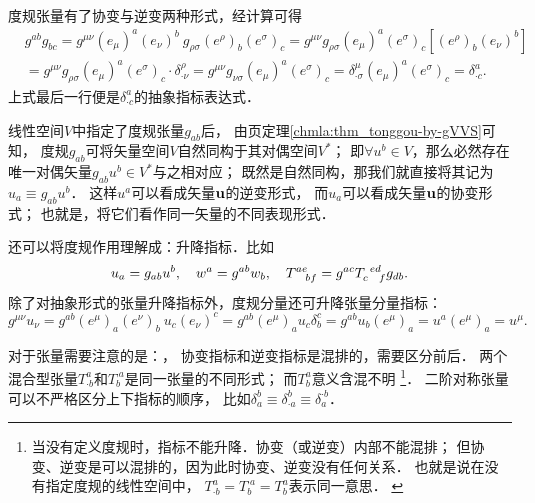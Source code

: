 度规张量有了协变与逆变两种形式，经计算可得
\begin{equation}
\begin{aligned}
    &g^{ab}g_{bc} = g^{\mu\nu} (e_\mu)^a (e_\nu)^b \ 
       g_{\rho\sigma} (e^\rho)_b (e^\sigma)_c
       =g^{\mu\nu}g_{\rho\sigma}(e_\mu)^a (e^\sigma)_c
       \left[(e^\rho)_b (e_\nu)^b \right] \\
    &= g^{\mu\nu}g_{\rho\sigma}(e_\mu)^a (e^\sigma)_c \cdot \delta^\rho _{\cdot \nu} 
     = g^{\mu\nu}g_{\nu\sigma}(e_\mu)^a (e^\sigma)_c 
    = \delta^\mu _{\cdot \sigma} (e_\mu)^a (e^\sigma)_c 
    = \delta^a_{\cdot c} .
\end{aligned}
\end{equation}
上式最后一行便是$\delta^a_{\cdot c}$的抽象指标表达式．


线性空间$V$中指定了度规张量$g_{ab}$后，
由\pageref{chmla:thm_tonggou-by-gVVS}页定理\ref{chmla:thm_tonggou-by-gVVS}可知，
度规$g_{ab}$可将矢量空间$V${\kaishu 自然同构}于其对偶空间$V^*$；
即$\forall u^b \in V$，那么必然存在唯一对偶矢量$g_{ab}u^b\in V^*$与之相对应；
既然是自然同构，那我们就直接将其记为$u_a \equiv g_{ab}u^b$．
这样$u^a$可以看成矢量$\bf u$的逆变形式，
而$u_a$可以看成矢量$\bf u$的协变形式；
也就是，将它们看作同一矢量的不同表现形式．


还可以将度规作用理解成：升降指标．比如
\begin{equation*}
    u_a =g_{ab}u^b, \quad w^a=g^{ab}w_b, \quad
    T^{ae}_{\hphantom{ae} bf}=g^{ac}T^{\hphantom{c} ed}_{c \hphantom{ed} f}g_{db} .
\end{equation*}
除了对抽象形式的张量升降指标外，度规分量还可升降张量分量指标：
\begin{equation*}
    g^{\mu\nu} u_\nu = g^{ab} (e^\mu)_a (e^\nu)_b \ u_c (e_\nu)^c
    =g^{ab} (e^\mu)_a  u_c \delta^c_b
    =g^{ab} u_b (e^\mu)_a  = u^a(e^\mu)_a = u^\mu .
\end{equation*}


对于张量需要注意的是：{\kaishu{}}，
协变指标和逆变指标是{\heiti{}}混排的，需要区分前后．
两个混合型张量$T^{a}_{\cdot b}$和$T^{\cdot a}_{b}$是同一张量的不同形式；
而$T^{a}_{b}$意义含混不明
{\footnote{当没有定义度规时，指标不能升降．协变（或逆变）内部不能混排；
        但协变、逆变是可以混排的，因为此时协变、逆变没有任何关系．
        也就是说在没有指定度规的线性空间中，
        $T^{a}_{\cdot b}=T^{\cdot a}_{b}=T^{a}_{b}$表示同一意思．
        \label{chdm:ft_index}}}．
二阶{\kaishu 对称}张量可以不严格区分上下指标的顺序，
比如$\delta_{a}^{b}\equiv \delta_{\cdot a}^{b}\equiv \delta_{a}^{\cdot b}$．

